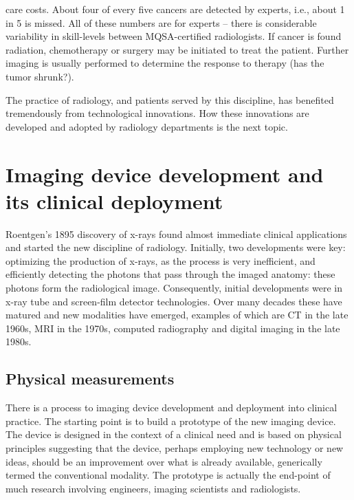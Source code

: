 \documentclass[
]{book}
\begin{document}
care costs. About four of every five cancers are detected by experts, i.e., about 1 in 5 is missed. All of these numbers are for experts -- there is considerable variability in skill-levels between MQSA-certified radiologists. If cancer is found radiation, chemotherapy or surgery may be initiated to treat the patient. Further imaging is usually performed to determine the response to therapy (has the tumor shrunk?).

The practice of radiology, and patients served by this discipline, has benefited tremendously from technological innovations. How these innovations are developed and adopted by radiology departments is the next topic.

\hypertarget{imaging-device-development-and-its-clinical-deployment}{%
\section{Imaging device development and its clinical deployment}\label{imaging-device-development-and-its-clinical-deployment}}

Roentgen's 1895 discovery of x-rays found almost immediate clinical applications and started the new discipline of radiology. Initially, two developments were key: optimizing the production of x-rays, as the process is very inefficient, and efficiently detecting the photons that pass through the imaged anatomy: these photons form the radiological image. Consequently, initial developments were in x-ray tube and screen-film detector technologies. Over many decades these have matured and new modalities have emerged, examples of which are CT in the late 1960s, MRI in the 1970s, computed radiography and digital imaging in the late 1980s.

\hypertarget{physical-measurements}{%
\subsection{Physical measurements}\label{physical-measurements}}

There is a process to imaging device development and deployment into clinical practice. The starting point is to build a prototype of the new imaging device. The device is designed in the context of a clinical need and is based on physical principles suggesting that the device, perhaps employing new technology or new ideas, should be an improvement over what is already available, generically termed the conventional modality. The prototype is actually the end-point of much research involving engineers, imaging scientists and radiologists.
\end{document}
